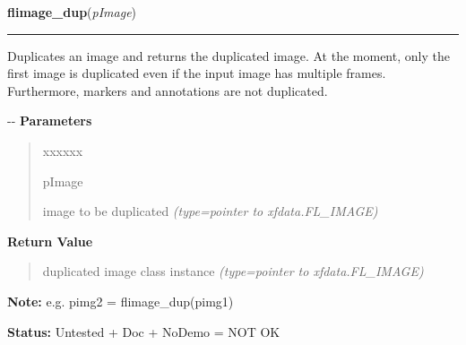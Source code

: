 \hspace{.8\funcindent}\begin{boxedminipage}{\funcwidth}

    \raggedright \textbf{flimage\_dup}(\textit{pImage})

    \vspace{-1.5ex}

    \rule{\textwidth}{0.5\fboxrule}
\setlength{\parskip}{2ex}

Duplicates an image and returns the duplicated image. At the moment,
only the first image is duplicated even if the input image has multiple
frames. Furthermore, markers and annotations are not duplicated.

-{}-
\setlength{\parskip}{1ex}
      \textbf{Parameters}
      \vspace{-1ex}

      \begin{quote}
        \begin{Ventry}{xxxxxx}

          \item[pImage]


image to be duplicated
            {\it (type=pointer to xfdata.FL\_IMAGE)}

        \end{Ventry}

      \end{quote}

      \textbf{Return Value}
    \vspace{-1ex}

      \begin{quote}

duplicated image class instance
      {\it (type=pointer to xfdata.FL\_IMAGE)}

      \end{quote}

\textbf{Note:} 
e.g. pimg2 = flimage\_dup(pimg1)


\textbf{Status:} 
Untested + Doc + NoDemo = NOT OK


    \end{boxedminipage}

    \label{xformslib:flflimage:fl_get_submatrix}

    \vspace{0.5ex}

